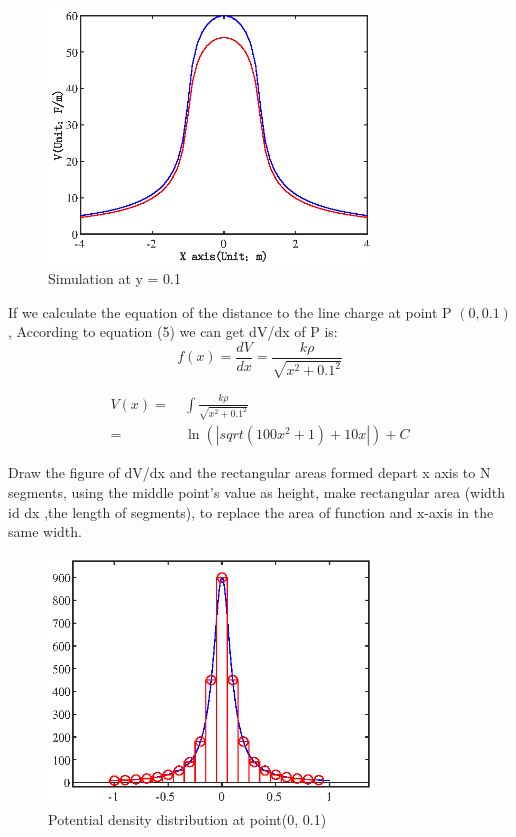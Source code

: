 \documentclass[10pt, journal, final]{IEEEtran}
\begin{document}


\begin{figure}[htbp]
    \centering
    \includegraphics[width = 3.4in]{figures-2/fig3.2.eps}
    \caption{Simulation at y = 0.1}
    \label{fig:3.2}
\end{figure}

If we calculate the equation of the distance to the line charge at point P $(0, 0.1)$,
According to equation (5) we can get dV/dx of P is:
\begin{equation}
    f(x) = \frac{dV}{dx} = \frac{k \rho}{\sqrt{x^2+0.1^2}}
\end{equation}

\begin{equation}
    \begin{aligned}
        V(x) = & \ \int{\frac{k \rho}{\sqrt{x^2+0.1^2}}}       \\
        =      & \ \ln(\left| sqrt(100x^2+1) +10x \right|) + C
    \end{aligned}
\end{equation}

Draw the figure of dV/dx and the rectangular areas formed
depart x axis to N segments, using the middle point's value as height,
make rectangular area (width id dx ,the length of segments),
to replace the area of function and x-axis in the same width.



\begin{figure}[htbp]
    \centering
    \includegraphics[width = 3.4in]{figures-2/fig3.3.eps}
    \caption{Potential density distribution at point(0, 0.1)}
    \label{fig:3.3}
\end{figure}
\end{document}
